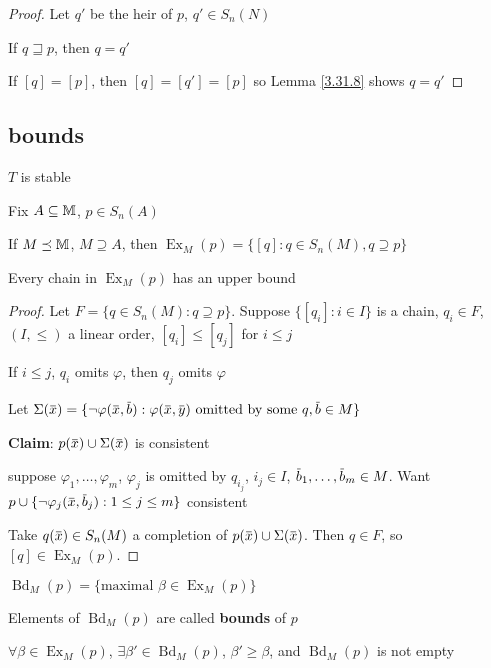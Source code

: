 \documentclass[11pt]{article}
\DeclareMathOperator{\Ex}{Ex}
\DeclareMathOperator{\Bd}{Bd}
\begin{document}
\begin{proof}
Let \(q'\) be the heir of \(p\), \(q'\in S_n(N)\)

If \(q\sqsupseteq p\), then \(q=q'\)

If \([q]=[p]\), then \([q]=[q']=[p]\) so Lemma \ref{3.31.8} shows \(q=q'\)
\end{proof}
\subsection{bounds}
\label{sec:org74b35ac}
\(T\) is stable

Fix \(A\subseteq\mathbb{M}\), \(p\in S_n(A)\)

\begin{definition}[]
If \(M\preceq\mathbb{M}\), \(M\supseteq A\), then \(\Ex_M(p)=\{[q]:q\in S_n(M), q\supseteq p\}\)
\end{definition}

\begin{lemma}[]
Every chain in \(\Ex_M(p)\) has an upper bound
\end{lemma}

\begin{proof}
Let \(F=\{q\in S_n(M):q\supseteq p\}\). Suppose \(\{[q_i]:i\in I\}\) is a chain, \(q_i\in F\), \((I,\le)\) a linear
order, \([q_i]\le[q_j]\) for \(i\le j\)

If \(i\le j\), \(q_i\) omits \(\varphi\), then \(q_j\) omits \(\varphi\)

Let \(\Sigma(\barx)=\{\neg\varphi(\barx,\barb):\varphi(\barx,\bary)\text{ omitted by some }q, \barb\in M\}\)

\textbf{Claim}: \(p(\barx)\cup\Sigma(\barx)\) is consistent

suppose \(\varphi_1,\dots,\varphi_m\), \(\varphi_j\) is omitted by \(q_{i_j}\), \(i_j\in I\), \(\barb_1,\dots,\barb_m\in M\).
Want \(p\cup\{\neg\varphi_j(\barx,\barb_j):1\le j\le m\}\) consistent

Take \(q(\barx)\in S_n(M)\) a completion of \(p(\barx)\cup\Sigma(\barx)\). Then \(q\in F\),
so \([q]\in\Ex_M(p)\).
\end{proof}

\begin{definition}[]
\(\Bd_M(p)=\{\text{maximal }\beta\in\Ex_M(p)\}\)

Elements of \(\Bd_M(p)\) are called \textbf{bounds} of \(p\)
\end{definition}

\begin{corollary}[]
\label{3.31.13}
\(\forall\beta\in\Ex_M(p)\), \(\exists\beta'\in\Bd_M(p)\), \(\beta'\ge\beta\), and \(\Bd_M(p)\) is not empty
\end{corollary}
\end{document}

